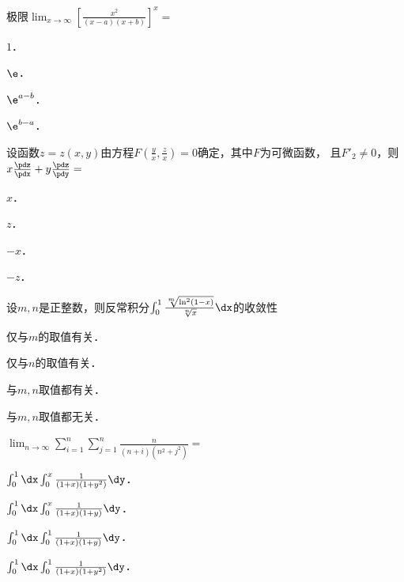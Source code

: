 \documentclass[plain,noanswer,medmath]{../../template/jnuexam}
\begin{document}




\begin{problem}
极限$\lim_{x \to \infty} \left[\frac{x^2}{(x - a)(x + b)} \right]^x =$\pickout{}
\begin{abcd}
\item $1$．
\item $\e$．
\item $\e^{a - b}$．
\item $\e^{b - a}$．
\end{abcd}
\end{problem}


\begin{problem}
设函数$z = z(x,y)$由方程$F\left(\frac{y}{x},\frac{z}{x} \right) = 0$确定，其中$F$为可微函数，
且$F'_2 \ne 0$，则$x\frac{\pdz}{\pdx} + y\frac{\pdz}{\pdy} =$\pickout{}
\begin{abcd}
\item $x$．
\item $z$．
\item $- x$．
\item $- z$．
\end{abcd}
\end{problem}


\begin{problem}
设$m,n$是正整数，则反常积分$\int_0^1 \frac{\sqrt[m]{\ln^2(1 - x)}}{\sqrt[n]{x}}\dx$的收敛性\pickout{}
\begin{abcd}
\item 仅与$m$的取值有关．
\item 仅与$n$的取值有关．
\item 与$m,n$取值都有关．
\item 与$m,n$取值都无关．
\end{abcd}
\end{problem}


\begin{problem}
$\lim_{n\to\infty} \sum_{i=1}^n \sum_{j=1}^n \frac{n}{(n+i)\left(n^2 + j^2 \right)} =$\pickout{}
\begin{abcd}
\item $\int_0^1 \dx\int_0^x \frac{1}{(1 + x)\left(1 + y^2 \right)} \dy$．
\item $\int_0^1 \dx\int_0^x \frac{1}{(1 + x)\left(1 + y \right)} \dy$．
\item $\int_0^1 \dx\int_0^1 \frac{1}{(1 + x)\left(1 + y \right)} \dy$．
\item $\int_0^1 \dx\int_0^1 \frac{1}{(1 + x)\left(1 + y^2 \right)} \dy$．
\end{abcd}
\end{problem}
\end{document}

